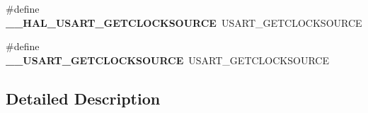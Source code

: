 \begin{DoxyCompactItemize}
\item 
\mbox{\label{group___h_a_l___u_s_a_r_t___aliased___macros_ga0ed768f9a18f877413306078c442a2a5}} 
\#define {\bfseries \+\_\+\+\_\+\+H\+A\+L\+\_\+\+U\+S\+A\+R\+T\+\_\+\+G\+E\+T\+C\+L\+O\+C\+K\+S\+O\+U\+R\+CE}~U\+S\+A\+R\+T\+\_\+\+G\+E\+T\+C\+L\+O\+C\+K\+S\+O\+U\+R\+CE
\item 
\mbox{\label{group___h_a_l___u_s_a_r_t___aliased___macros_gaa00a53bf6bc2bee096abb57d4ace2384}} 
\#define {\bfseries \+\_\+\+\_\+\+U\+S\+A\+R\+T\+\_\+\+G\+E\+T\+C\+L\+O\+C\+K\+S\+O\+U\+R\+CE}~U\+S\+A\+R\+T\+\_\+\+G\+E\+T\+C\+L\+O\+C\+K\+S\+O\+U\+R\+CE
\end{DoxyCompactItemize}


\subsection{Detailed Description}
